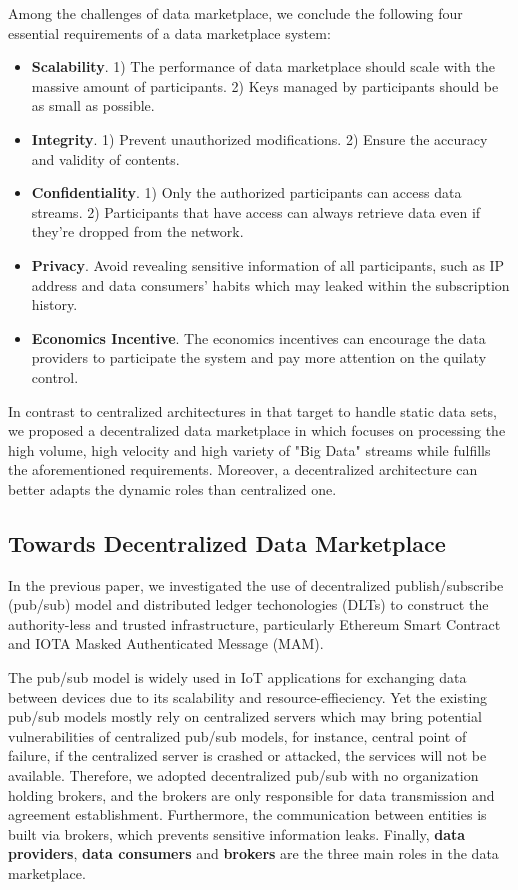 \documentclass[conference]{IEEEtran}
\begin{document}
Among the challenges of data marketplace\cite{BigDataMarket}, we conclude the following four essential requirements of a data marketplace system:
\begin{itemize}
	\item \textbf{Scalability}. 
1) The performance of data marketplace should scale with the massive amount of participants. 2) Keys managed by participants should be as small as possible. 
	\item \textbf{Integrity}. 1) Prevent unauthorized modifications. 2) Ensure the accuracy and validity of contents.	
	\item \textbf{Confidentiality}. 
1) Only the authorized participants can access data streams. 2) Participants that have access can always retrieve data even if they're dropped from the network.	
	\item \textbf{Privacy}. Avoid revealing sensitive information of all participants, such as IP address and data consumers' habits which may leaked within the subscription history.
	\item \textbf{Economics Incentive}. The economics incentives can encourage the data providers to participate the system and pay more attention on the quilaty control. 
\end{itemize}

In contrast to centralized architectures in \cite{DIaas, IOTAIdustryMarketplace, MARSA} that target to handle static data sets, we proposed a decentralized data marketplace in \cite{MyDataMarketplace} which focuses on processing the high volume, high velocity and high variety of "Big Data" streams\cite{BigData} while fulfills the aforementioned requirements. Moreover, a decentralized architecture can better adapts the dynamic roles than centralized one. 

\subsection{Towards Decentralized Data Marketplace}
In the previous paper, we investigated the use of decentralized publish/subscribe (pub/sub) model and distributed ledger techonologies (DLTs) to construct the authority-less and trusted infrastructure, particularly  Ethereum Smart Contract\cite{smartContract} and IOTA Masked Authenticated Message (MAM)\cite{MAM}. 

The pub/sub model is widely used in IoT applications for exchanging data between devices due to its scalability and resource-effieciency.  Yet the existing pub/sub models\cite{MQTT, Looci, centralPubSub} mostly rely on centralized servers which may bring potential vulnerabilities of centralized pub/sub models, for instance, central point of failure, if the centralized server is crashed or attacked, the services will not be available. Therefore, we adopted decentralized pub/sub with no organization holding brokers, and the brokers are only responsible for data transmission and agreement establishment. Furthermore, the communication between entities is built via brokers, which prevents sensitive information leaks. Finally, \textbf{data providers}, \textbf{data consumers} and \textbf{brokers} are the three main roles in the data marketplace.
\end{document}
